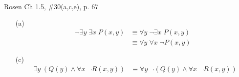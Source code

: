 \documentclass[12pt,addpoints]{exam}
\begin{document}
\begin{questions}
\question Rosen Ch 1.5, \#30(a,c,e), p. 67
    \begin{solution}
    \begin{itemize}
        \item[(a)] 
        \begin{align*}
          \neg \exists y\; \exists x\; P(x,y) & \equiv \forall y\; \neg \exists x\; P(x,y) \\
          & \equiv \forall y\; \forall x\; \neg P(x,y)
        \end{align*}
        \item[(c)] 
        \begin{align*}
          \neg \exists y\; (Q(y) \wedge \forall x\; \neg R(x,y)) & \equiv \forall y\; \neg(Q(y) \wedge \forall x\; \neg R(x,y)) \\

\end{align*}
\end{itemize}
\end{solution}
\end{questions}
\end{document}
